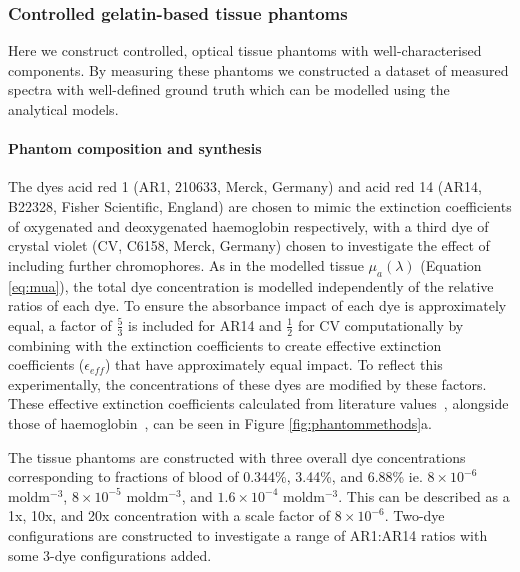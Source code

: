 \subsubsection{Controlled gelatin-based tissue phantoms}\label{sec:methodsphantoms}
Here we construct controlled, optical tissue phantoms with well-characterised components. By measuring these phantoms we constructed a dataset of measured spectra with well-defined ground truth which can be modelled using the analytical models.

\paragraph{Phantom composition and synthesis}\label{sec:methodsphantomcomposition}

The dyes acid red 1 (AR1, 210633, Merck, Germany) and acid red 14 (AR14, B22328, Fisher Scientific, England) are chosen to mimic the extinction coefficients of oxygenated and deoxygenated haemoglobin respectively, with a third dye of crystal violet (CV, C6158, Merck, Germany) chosen to investigate the effect of including further chromophores. As in the modelled tissue $\mu_a(\lambda)$ (Equation \eqref{eq:mua}), the total dye concentration is modelled independently of the relative ratios of each dye. To ensure the absorbance impact of each dye is approximately equal, a factor of $\frac{5}{3}$ is included for AR14 and $\frac{1}{2}$ for CV computationally by combining with the extinction coefficients to create effective extinction coefficients ($\epsilon_{eff}$) that have approximately equal impact. To reflect this experimentally, the concentrations of these dyes are modified by these factors. These effective extinction coefficients calculated from literature values~\citep{PhotochemCAD}, alongside those of haemoglobin~\citep{Prahl1998}, can be seen in Figure \ref{fig:phantommethods}a. 

The tissue phantoms are constructed with three overall dye concentrations corresponding to fractions of blood of 0.344\%, 3.44\%, and 6.88\% ie. $8\times10^{-6}$ moldm$^{-3}$, $8\times10^{-5}$ moldm$^{-3}$, and $1.6\times10^{-4}$ moldm$^{-3}$. This can be described as a 1x, 10x, and 20x concentration with a scale factor of $8\times10^{-6}$.
Two-dye configurations are constructed to investigate a range of AR1:AR14 ratios with some 3-dye configurations added. 

